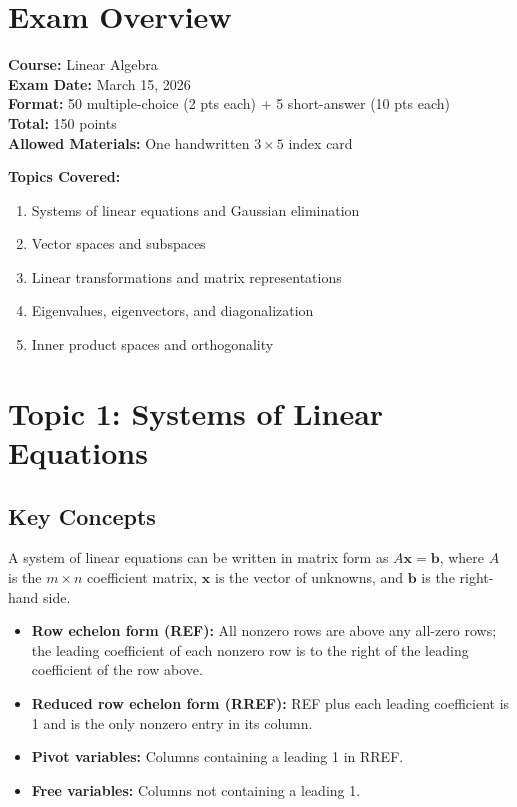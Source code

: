 \documentclass[
    language=english,
    doctype=study-guide,
    institution=none,
]{../../omnilatex}
\begin{document}
\maketitle

\section{Exam Overview}

\noindent\textbf{Course:} Linear Algebra \\
\textbf{Exam Date:} March 15, 2026 \\
\textbf{Format:} 50 multiple-choice (2 pts each) + 5 short-answer (10 pts each) \\
\textbf{Total:} 150 points \\
\textbf{Allowed Materials:} One handwritten $3 \times 5$ index card

\bigskip
\noindent\textbf{Topics Covered:}
\begin{enumerate}
    \item Systems of linear equations and Gaussian elimination
    \item Vector spaces and subspaces
    \item Linear transformations and matrix representations
    \item Eigenvalues, eigenvectors, and diagonalization
    \item Inner product spaces and orthogonality
\end{enumerate}

\section{Topic 1: Systems of Linear Equations}

\subsection{Key Concepts}

A system of linear equations can be written in matrix form as $A\mathbf{x} = \mathbf{b}$, where $A$ is the $m \times n$ coefficient matrix, $\mathbf{x}$ is the vector of unknowns, and $\mathbf{b}$ is the right-hand side.

\begin{itemize}
    \item \textbf{Row echelon form (REF):} All nonzero rows are above any all-zero rows; the leading coefficient of each nonzero row is to the right of the leading coefficient of the row above.
    \item \textbf{Reduced row echelon form (RREF):} REF plus each leading coefficient is 1 and is the only nonzero entry in its column.
    \item \textbf{Pivot variables:} Columns containing a leading 1 in RREF.
    \item \textbf{Free variables:} Columns not containing a leading 1.
\end{itemize}
\end{document}

